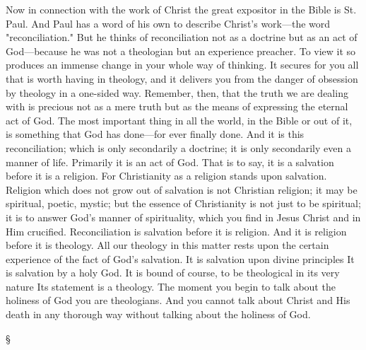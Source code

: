 \documentclass[12pt,a5paper,twoside,titlepage]{book}
\begin{document}
Now in connection with the work of Christ 
the great expositor in the Bible is St. Paul. 
And Paul has a word of his own to describe 
Christ's work---the word "reconciliation." But 
he thinks of reconciliation not as a doctrine but 
as an act of God---because he was not a theologian 
but an experience preacher. To view it 
so produces an immense change in your whole 
way of thinking. It secures for you all that 
is worth having in theology, and it delivers 
you from the danger of obsession by theology 
in a one-sided way. Remember, then, that the 
truth we are dealing with is precious not as a 
mere truth but as the means of expressing the 
eternal act of God. The most important thing 
in all the world, in the Bible or out of it, is 
something that God has done---for ever finally 
done. And it is this reconciliation; which is 
only secondarily a doctrine; it is only secondarily 
even a manner of life. Primarily it is an act of 
God. That is to say, it is a salvation before it is 
a religion. For Christianity as a religion stands 
upon salvation. Religion which does not grow 
out of salvation is not Christian religion; it 
may be spiritual, poetic, mystic; but the essence 
of Christianity is not just to be spiritual; it is 
to answer God's manner of spirituality, which 
you find in Jesus Christ and in Him crucified. 
Reconciliation is salvation before it is religion. 
And it is religion before it is theology. All 
our theology in this matter rests upon the 
certain experience of the fact of God's salvation. 
It is salvation upon divine principles 
It is salvation by a holy God. It is bound 
of course, to be theological in its very nature 
Its statement is a theology. The moment 
you begin to talk about the holiness of God 
you are theologians. And you cannot talk 
about Christ and His death in any thorough 
way without talking about the holiness of 
God. 

\begin{center}
\S 
\end{center} 
\end{document}
